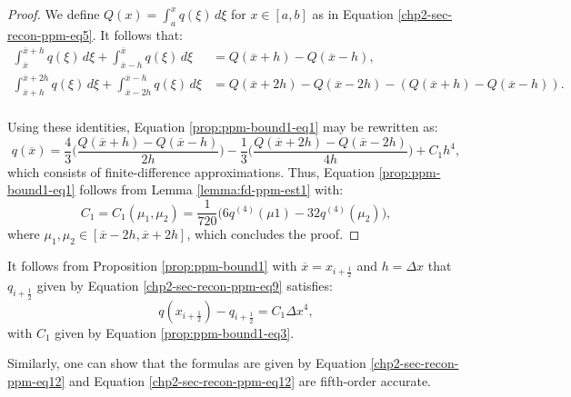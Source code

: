 \begin{proof}
	We define $Q(x) = \int_{a}^{x} q(\xi) \,d\xi$ for $x \in [a,b]$ as in 
	Equation \eqref{chp2-sec-recon-ppm-eq5}. It follows that:
	\begin{align*}
		\int_{\overline{x}}^{\overline{x}+h} q(\xi) \,d\xi + \int_{\overline{x}-h}^{\overline{x}} q(\xi) \,d\xi &=
		Q(\overline{x}+h) - Q(\overline{x}-h), \\
		\int_{\overline{x}+h}^{\overline{x}+2h} q(\xi) \,d\xi + \int_{\overline{x}-2h}^{\overline{x}-h} q(\xi) \,d\xi &=
		Q(\overline{x}+2h) - Q(\overline{x}-2h) - (Q(\overline{x}+h) - Q(\overline{x}-h)). \\
	\end{align*}
	
	Using these identities, Equation \eqref{prop:ppm-bound1-eq1} may be rewritten as:
	\begin{equation}
		\label{prop:ppm-bound1-eq2}
		q(\overline{x}) = \frac{4}{3} \bigg(\frac{Q(\overline{x}+h) - Q(\overline{x}-h)}{2h}\bigg)
		       - \frac{1}{3} \bigg(\frac{Q(\overline{x}+2h) - Q(\overline{x}-2h)}{4h}\bigg) + C_1h^4,
	\end{equation}
	which consists of finite-difference approximations. 
	Thus, Equation \eqref{prop:ppm-bound1-eq1} follows from Lemma \ref{lemma:fd-ppm-est1}
	with:
	\begin{equation}
		\label{prop:ppm-bound1-eq3}
		C_1 = C_1(\mu_1,\mu_2) = \frac{1}{720}\bigg(6q^{(4)}(\mu{1}) -32q^{(4)}(\mu_{2})\bigg), 
	\end{equation}
	where $\mu_{1}, \mu_{2} \in [\overline{x}-2h,\overline{x}+2h]$,
	which concludes the proof.
\end{proof}

\begin{corollary}
	\label{prop:ppm-bound1-corollary}
	It follows from Proposition \ref{prop:ppm-bound1} with
	$\overline{x} = x_{i+\frac{1}{2}}$ and $h = \Delta x$
	that $q_{i+\frac{1}{2}}$ given by Equation \eqref{chp2-sec-recon-ppm-eq9} satisfies:
	\begin{equation}
		\label{ppm-edges-bound1}
		q{(x_{i+\frac{1}{2}})} - q_{i+\frac{1}{2}} = C_1\Delta x^4,
	\end{equation}
	with $C_1$ given by Equation \eqref{prop:ppm-bound1-eq3}.
\end{corollary}

\begin{remark}
	Similarly, one can show that the formulas are given by Equation
	\eqref{chp2-sec-recon-ppm-eq12} and Equation \eqref{chp2-sec-recon-ppm-eq12}
	are fifth-order accurate.
\end{remark}

